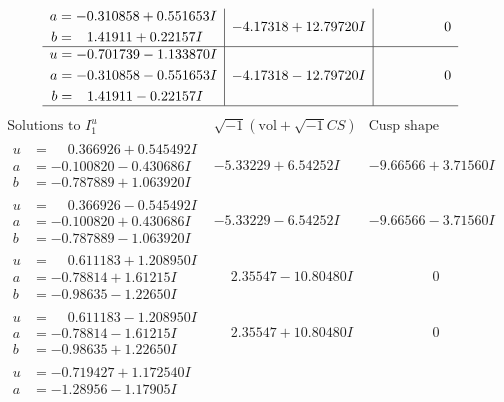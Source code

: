 \documentclass[1p]{elsarticle_modified}
\theoremstyle{definition}
\newcommand{\I}{\sqrt{-1}}
\begin{document}
$$\begin{array}{c|c|c}
\begin{aligned}
a &= -0.310858 + 0.551653 I \\
b &= \phantom{-}1.41911 + 0.22157 I\end{aligned}
 & -4.17318 + 12.79720 I & \phantom{-0.000000 } 0 \\ \hline\begin{aligned}
u &= -0.701739 - 1.133870 I \\
a &= -0.310858 - 0.551653 I \\
b &= \phantom{-}1.41911 - 0.22157 I\end{aligned}
 & -4.17318 - 12.79720 I & \phantom{-0.000000 } 0\\
 \hline 
 \end{array}$$\newpage$$\begin{array}{c|c|c}  
\text{Solutions to }I^u_{1}& \I (\text{vol} + \sqrt{-1}CS) & \text{Cusp shape}\\
 \hline 
\begin{aligned}
u &= \phantom{-}0.366926 + 0.545492 I \\
a &= -0.100820 - 0.430686 I \\
b &= -0.787889 + 1.063920 I\end{aligned}
 & -5.33229 + 6.54252 I & -9.66566 + 3.71560 I \\ \hline\begin{aligned}
u &= \phantom{-}0.366926 - 0.545492 I \\
a &= -0.100820 + 0.430686 I \\
b &= -0.787889 - 1.063920 I\end{aligned}
 & -5.33229 - 6.54252 I & -9.66566 - 3.71560 I \\ \hline\begin{aligned}
u &= \phantom{-}0.611183 + 1.208950 I \\
a &= -0.78814 + 1.61215 I \\
b &= -0.98635 - 1.22650 I\end{aligned}
 & \phantom{-}2.35547 - 10.80480 I & \phantom{-0.000000 } 0 \\ \hline\begin{aligned}
u &= \phantom{-}0.611183 - 1.208950 I \\
a &= -0.78814 - 1.61215 I \\
b &= -0.98635 + 1.22650 I\end{aligned}
 & \phantom{-}2.35547 + 10.80480 I & \phantom{-0.000000 } 0 \\ \hline\begin{aligned}
u &= -0.719427 + 1.172540 I \\
a &= -1.28956 - 1.17905 I \\

\end{aligned}
\end{array}$$
\end{document}
